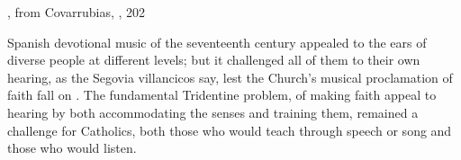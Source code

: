 {, from Covarrubias,
, 202}

Spanish devotional music of the seventeenth century appealed to the ears of
diverse people at different levels; but it challenged all of them to
 their own hearing, as the Segovia villancicos say, lest the
Church's musical proclamation of faith fall on .
The fundamental Tridentine problem, of making faith appeal to hearing by both
accommodating the senses and training them, remained a challenge for Catholics,
both those who would teach through speech or song and those who would listen.

\endinput
